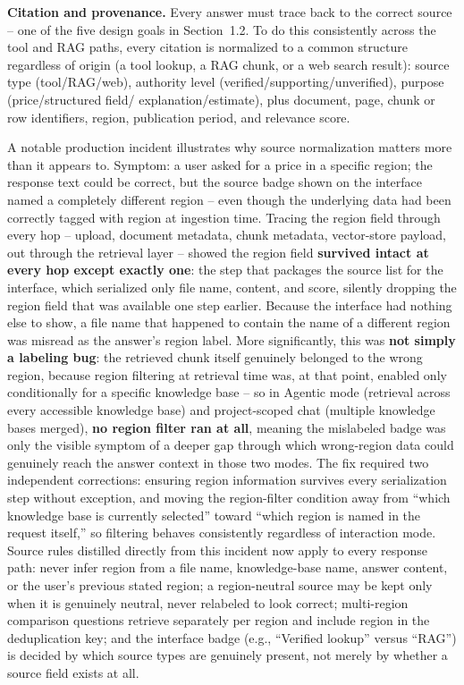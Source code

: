 \documentclass[11pt,a4paper]{article}
\begin{document}
\textbf{Citation and provenance.} Every answer must trace back to the
correct source -- one of the five design goals in Section~1.2. To do this
consistently across the tool and RAG paths, every citation is normalized to
a common structure regardless of origin (a tool lookup, a RAG chunk, or a
web search result): source type (tool/RAG/web), authority level
(verified/supporting/unverified), purpose (price/structured field/
explanation/estimate), plus document, page, chunk or row identifiers,
region, publication period, and relevance score.

A notable production incident illustrates why source normalization matters
more than it appears to. Symptom: a user asked for a price in a specific
region; the response text could be correct, but the source badge shown on
the interface named a completely different region -- even though the
underlying data had been correctly tagged with region at ingestion time.
Tracing the region field through every hop -- upload, document metadata,
chunk metadata, vector-store payload, out through the retrieval layer --
showed the region field \textbf{survived intact at every hop except exactly
one}: the step that packages the source list for the interface, which
serialized only file name, content, and score, silently dropping the region
field that was available one step earlier. Because the interface had
nothing else to show, a file name that happened to contain the name of a
different region was misread as the answer's region label. More
significantly, this was \textbf{not simply a labeling bug}: the retrieved
chunk itself genuinely belonged to the wrong region, because region
filtering at retrieval time was, at that point, enabled only conditionally
for a specific knowledge base -- so in Agentic mode (retrieval across every
accessible knowledge base) and project-scoped chat (multiple knowledge bases
merged), \textbf{no region filter ran at all}, meaning the mislabeled badge
was only the visible symptom of a deeper gap through which wrong-region data
could genuinely reach the answer context in those two modes. The fix
required two independent corrections: ensuring region information survives
every serialization step without exception, and moving the region-filter
condition away from ``which knowledge base is currently selected'' toward
``which region is named in the request itself,'' so filtering behaves
consistently regardless of interaction mode. Source rules distilled directly
from this incident now apply to every response path: never infer region
from a file name, knowledge-base name, answer content, or the user's
previous stated region; a region-neutral source may be kept only when it is
genuinely neutral, never relabeled to look correct; multi-region comparison
questions retrieve separately per region and include region in the
deduplication key; and the interface badge (e.g., ``Verified lookup'' versus
``RAG'') is decided by which source types are genuinely present, not merely
by whether a source field exists at all.
\end{document}
